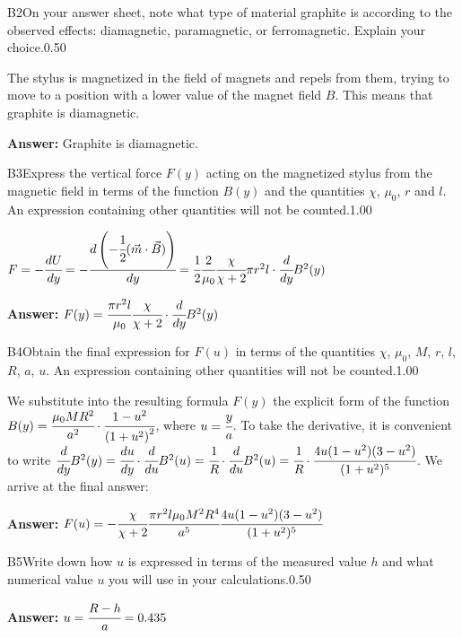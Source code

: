 \documentclass[11pt,a4paper]{article}
\begin{document}
\begin{solcard}{B2}{On your answer sheet, note what type of material graphite is according to the observed effects: diamagnetic, paramagnetic, or ferromagnetic. Explain your choice.}{0.50}

The stylus is magnetized in the field of magnets and repels from them, trying to move to a position with a lower value of the magnet field $B$. This means that graphite is diamagnetic.

\par\smallskip\noindent\textbf{Answer:} Graphite is diamagnetic.
\end{solcard}

\begin{solcard}{B3}{Express the vertical force $F(y)$ acting on the magnetized stylus from the magnetic field in terms of the function $B(y)$ and the quantities $\chi$, $\mu_0$, $r$ and $l$. An expression containing other quantities will not be counted.}{1.00}

$F = -\cfrac{dU}{dy} = -\cfrac{d \left( -\cfrac{1}{2}(\vec m \cdot \vec B) \right)}{dy} = \cfrac{1}{2} \cfrac{2}{\mu_0} \cfrac{\chi}{\chi + 2} \pi r^2 l \cdot \cfrac{d}{dy} B^2 (y)$

\par\smallskip\noindent\textbf{Answer:} $F(y) = \cfrac{\pi r^2l}{\mu_0} \cfrac{\chi}{\chi+2} \cdot \cfrac{d}{dy} B^2 (y)$
\end{solcard}

\begin{solcard}{B4}{Obtain the final expression for $F(u)$ in terms of the quantities $\chi$, $\mu_0$, $M$, $r$, $l$, $R$, $a$, $u$. An expression containing other quantities will not be counted.}{1.00}

We substitute into the resulting formula $F(y)$ the explicit form of the function $ B(y) = \cfrac{\mu_0 M R^2}{a^2} \cdot \cfrac{1-u^2}{\left( 1+u^2 \right) ^2}$, where $u=\cfrac{y}{a}$. To take the derivative, it is convenient to write $ \cfrac{d}{dy} B^2 (y) = \cfrac{du}{dy} \cdot \cfrac{d}{du} B^2 (u) = \cfrac{1}{R} \cdot \cfrac{d}{du} B^2 (u) = \cfrac{1}{R} \cdot \cfrac{4u(1-u^2)(3-u^2)}{(1+u^2)^5}$. We arrive at the final answer:

\par\smallskip\noindent\textbf{Answer:} $F(u)=-\cfrac{\chi}{\chi+2} \cfrac{\pi r^2l \mu_0 M^2R^4}{a^5} \cfrac{4u(1-u^2)(3-u^2)}{(1+u^2)^5}$
\end{solcard}

\begin{solcard}{B5}{Write down how $u$ is expressed in terms of the measured value $h$ and what numerical value $u$ you will use in your calculations.}{0.50}
\par\smallskip\noindent\textbf{Answer:} $u=\cfrac{R-h}{a}=0.435$
\end{solcard}
\end{document}
